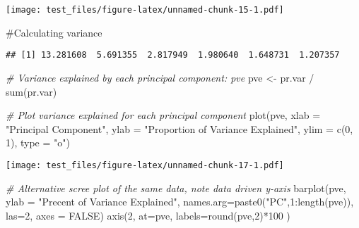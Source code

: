\documentclass[
]{article}
\newenvironment{Shaded}{\begin{snugshade}}{\end{snugshade}}
\newcommand{\AttributeTok}[1]{\textcolor[rgb]{0.77,0.63,0.00}{#1}}
\newcommand{\CommentTok}[1]{\textcolor[rgb]{0.56,0.35,0.01}{\textit{#1}}}
\newcommand{\ConstantTok}[1]{\textcolor[rgb]{0.00,0.00,0.00}{#1}}
\newcommand{\DecValTok}[1]{\textcolor[rgb]{0.00,0.00,0.81}{#1}}
\newcommand{\FunctionTok}[1]{\textcolor[rgb]{0.00,0.00,0.00}{#1}}
\newcommand{\NormalTok}[1]{#1}
\newcommand{\OtherTok}[1]{\textcolor[rgb]{0.56,0.35,0.01}{#1}}
\newcommand{\SpecialCharTok}[1]{\textcolor[rgb]{0.00,0.00,0.00}{#1}}
\newcommand{\StringTok}[1]{\textcolor[rgb]{0.31,0.60,0.02}{#1}}
\begin{document}
\texttt{[image: test\_files/figure-latex/unnamed-chunk-15-1.pdf]}

\#Calculating variance

\begin{Shaded}
\end{Shaded}

\begin{verbatim}
## [1] 13.281608  5.691355  2.817949  1.980640  1.648731  1.207357
\end{verbatim}

\begin{Shaded}
\begin{Highlighting}[]
\CommentTok{\# Variance explained by each principal component: pve}
\NormalTok{pve }\OtherTok{\textless{}{-}}\NormalTok{ pr.var }\SpecialCharTok{/} \FunctionTok{sum}\NormalTok{(pr.var)}

\CommentTok{\# Plot variance explained for each principal component}
\FunctionTok{plot}\NormalTok{(pve, }\AttributeTok{xlab =} \StringTok{"Principal Component"}\NormalTok{, }
     \AttributeTok{ylab =} \StringTok{"Proportion of Variance Explained"}\NormalTok{, }
     \AttributeTok{ylim =} \FunctionTok{c}\NormalTok{(}\DecValTok{0}\NormalTok{, }\DecValTok{1}\NormalTok{), }\AttributeTok{type =} \StringTok{"o"}\NormalTok{)}
\end{Highlighting}
\end{Shaded}

\texttt{[image: test\_files/figure-latex/unnamed-chunk-17-1.pdf]}

\begin{Shaded}
\begin{Highlighting}[]
\CommentTok{\# Alternative scree plot of the same data, note data driven y{-}axis}
\FunctionTok{barplot}\NormalTok{(pve, }\AttributeTok{ylab =} \StringTok{"Precent of Variance Explained"}\NormalTok{,}
     \AttributeTok{names.arg=}\FunctionTok{paste0}\NormalTok{(}\StringTok{"PC"}\NormalTok{,}\DecValTok{1}\SpecialCharTok{:}\FunctionTok{length}\NormalTok{(pve)), }\AttributeTok{las=}\DecValTok{2}\NormalTok{, }\AttributeTok{axes =} \ConstantTok{FALSE}\NormalTok{)}
\FunctionTok{axis}\NormalTok{(}\DecValTok{2}\NormalTok{, }\AttributeTok{at=}\NormalTok{pve, }\AttributeTok{labels=}\FunctionTok{round}\NormalTok{(pve,}\DecValTok{2}\NormalTok{)}\SpecialCharTok{*}\DecValTok{100}\NormalTok{ )}
\end{Highlighting}
\end{Shaded}
\end{document}
